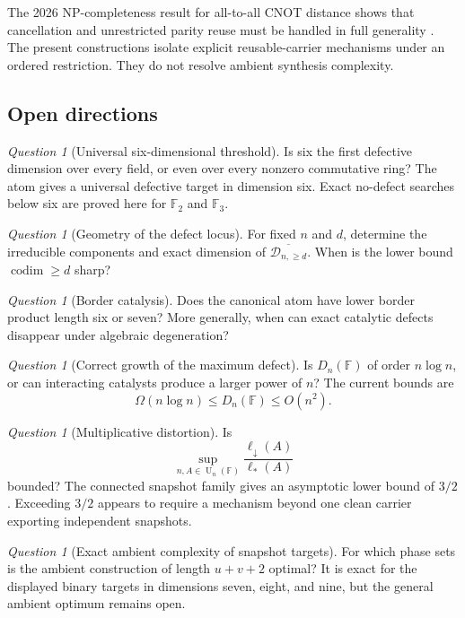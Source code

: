 \documentclass[11pt]{amsart}
\numberwithin{equation}{section}
\theoremstyle{definition}
\theoremstyle{remark}
\newtheorem{question}[theorem]{Question}
\newcommand{\F}{\mathbb F}
\newcommand{\U}{\operatorname{U}}
\newcommand{\ellDown}{\ell_{\downarrow}}
\newcommand{\ellAll}{\ell_{*}}
\newcommand{\codim}{\operatorname{codim}}
\begin{document}
The 2026 NP-completeness result for all-to-all CNOT distance shows that cancellation and unrestricted parity reuse must be handled in full generality \cite{AcuavivaEtAl2026}.  The present constructions isolate explicit reusable-carrier mechanisms under an ordered restriction.  They do not resolve ambient synthesis complexity.

\subsection{Open directions}

\begin{question}[Universal six-dimensional threshold]
Is six the first defective dimension over every field, or even over every nonzero commutative ring?  The atom gives a universal defective target in dimension six.  Exact no-defect searches below six are proved here for $\F_2$ and $\F_3$.
\end{question}

\begin{question}[Geometry of the defect locus]
For fixed $n$ and $d$, determine the irreducible components and exact dimension of $\overline{\mathcal D_{n,\ge d}}$.  When is the lower bound $\codim\ge d$ sharp?
\end{question}

\begin{question}[Border catalysis]
Does the canonical atom have lower border product length six or seven?  More generally, when can exact catalytic defects disappear under algebraic degeneration?
\end{question}

\begin{question}[Correct growth of the maximum defect]
Is $D_n(\F)$ of order $n\log n$, or can interacting catalysts produce a larger power of $n$?  The current bounds are
\[
\Omega(n\log n)
\le
D_n(\F)
\le
O(n^2).
\]
\end{question}

\begin{question}[Multiplicative distortion]
Is
\[
\sup_{n,A\in\U_n(\F)}
\frac{\ellDown(A)}{\ellAll(A)}
\]
bounded?  The connected snapshot family gives an asymptotic lower bound of $3/2$.  Exceeding $3/2$ appears to require a mechanism beyond one clean carrier exporting independent snapshots.
\end{question}

\begin{question}[Exact ambient complexity of snapshot targets]
For which phase sets is the ambient construction of length $u+v+2$ optimal?  It is exact for the displayed binary targets in dimensions seven, eight, and nine, but the general ambient optimum remains open.
\end{question}
\end{document}

